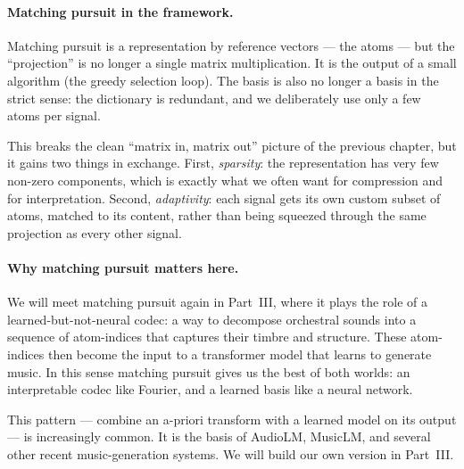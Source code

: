 
\paragraph{Matching pursuit in the framework.}  Matching pursuit is a
representation by reference vectors --- the atoms --- but the
``projection'' is no longer a single matrix multiplication.  It is the
output of a small algorithm (the greedy selection loop).  The basis is
also no longer a basis in the strict sense: the dictionary is redundant,
and we deliberately use only a few atoms per signal.

This breaks the clean ``matrix in, matrix out'' picture of the previous
chapter, but it gains two things in exchange.  First, \emph{sparsity}:
the representation has very few non-zero components, which is exactly
what we often want for compression and for interpretation.  Second,
\emph{adaptivity}: each signal gets its own custom subset of atoms,
matched to its content, rather than being squeezed through the same
projection as every other signal.

\paragraph{Why matching pursuit matters here.}  We will meet matching
pursuit again in Part~III, where it plays the role of a learned-but-not-neural
codec: a way to decompose orchestral sounds into a sequence of
atom-indices that captures their timbre and structure.  These
atom-indices then become the input to a transformer model that learns
to generate music.  In this sense matching pursuit gives us the best
of both worlds: an interpretable codec like Fourier, and a learned
basis like a neural network.

This pattern --- combine an a-priori transform with a learned model on
its output --- is increasingly common.  It is the basis of AudioLM,
MusicLM, and several other recent music-generation systems.  We will
build our own version in Part~III.

